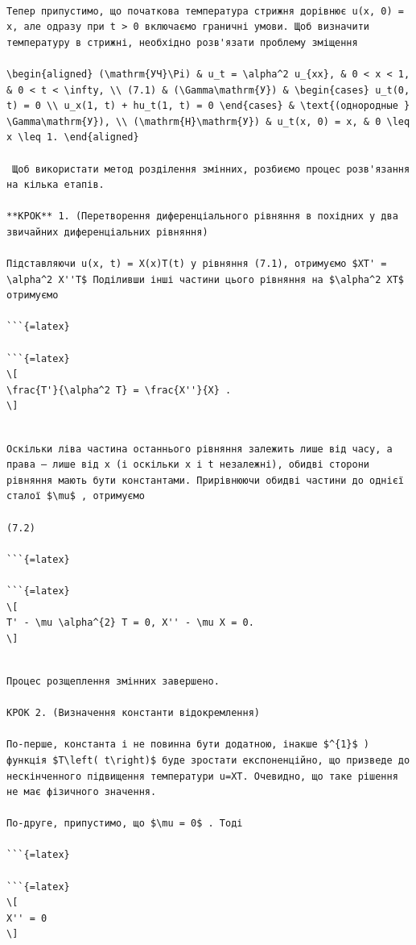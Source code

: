 \documentclass[
]{article}
\begin{document}
\begin{verbatim}

Тепер припустимо, що початкова температура стрижня дорівнює u(x, 0) = x, але одразу при t > 0 включаємо граничні умови. Щоб визначити температуру в стрижні, необхідно розв'язати проблему зміщення

\begin{aligned} (\mathrm{УЧ}\Pi) & u_t = \alpha^2 u_{xx}, & 0 < x < 1, & 0 < t < \infty, \\ (7.1) & (\Gamma\mathrm{У}) & \begin{cases} u_t(0, t) = 0 \\ u_x(1, t) + hu_t(1, t) = 0 \end{cases} & \text{(однородные } \Gamma\mathrm{У}), \\ (\mathrm{H}\mathrm{У}) & u_t(x, 0) = x, & 0 \leq x \leq 1. \end{aligned}

 Щоб використати метод розділення змінних, розбиємо процес розв'язання на кілька етапів.

**КРОК** 1. (Перетворення диференціального рівняння в похідних у два звичайних диференціальних рівняння)

Підставляючи u(x, t) = X(x)T(t) у рівняння (7.1), отримуємо $XT' = \alpha^2 X''T$ Поділивши інші частини цього рівняння на $\alpha^2 XT$ отримуємо

```{=latex}

```{=latex}
\[
\frac{T'}{\alpha^2 T} = \frac{X''}{X} .
\]
\end{verbatim}

\begin{verbatim}

Оскільки ліва частина останнього рівняння залежить лише від часу, а права — лише від x (і оскільки x і t незалежні), обидві сторони рівняння мають бути константами. Прирівнюючи обидві частини до однієї сталої $\mu$ , отримуємо

(7.2)

```{=latex}

```{=latex}
\[
T' - \mu \alpha^{2} T = 0, X'' - \mu X = 0.
\]
\end{verbatim}

\begin{verbatim}

Процес розщеплення змінних завершено.

КРОК 2. (Визначення константи відокремлення)

По-перше, константа і не повинна бути додатною, інакше $^{1}$ ) функція $T\left( t\right)$ буде зростати експоненційно, що призведе до нескінченного підвищення температури u=XT. Очевидно, що таке рішення не має фізичного значення.

По-друге, припустимо, що $\mu = 0$ . Тоді

```{=latex}

```{=latex}
\[
X'' = 0
\]
\end{verbatim}
\end{document}
